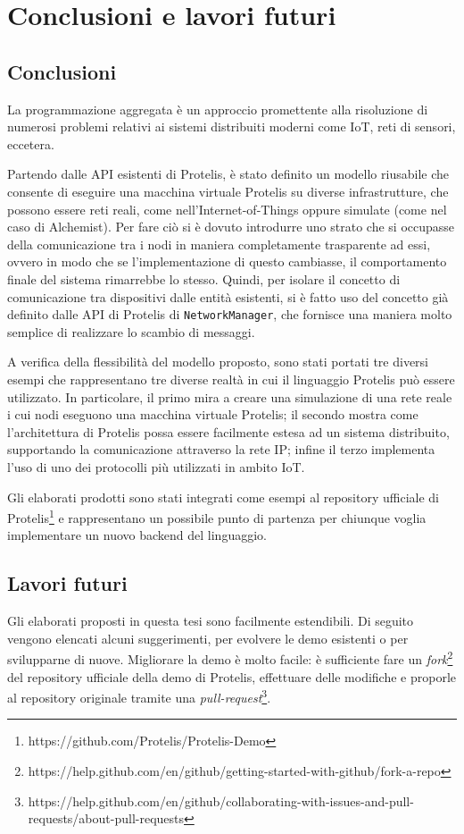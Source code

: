 \chapter{Conclusioni e lavori futuri}
\section{Conclusioni}
La programmazione aggregata è un approccio promettente alla risoluzione di
numerosi problemi relativi ai sistemi distribuiti moderni come IoT, reti di
sensori, eccetera.

Partendo dalle API esistenti di Protelis, è stato definito un modello riusabile
che consente di eseguire una macchina virtuale Protelis su diverse
infrastrutture, che possono essere reti reali, come nell'Internet-of-Things
oppure simulate (come nel caso di Alchemist). Per fare ciò si è dovuto
introdurre uno strato che si occupasse della comunicazione tra i nodi in maniera
completamente trasparente ad essi, ovvero in modo che se l'implementazione di
questo cambiasse, il comportamento finale del sistema rimarrebbe lo stesso. Quindi, per
isolare il concetto di comunicazione tra dispositivi dalle entità esistenti, si
è fatto uso del concetto già definito dalle API di Protelis di
\texttt{NetworkManager}, che fornisce una maniera molto semplice di realizzare
lo scambio di messaggi.

A verifica della flessibilità del modello proposto, sono stati portati tre
diversi esempi che rappresentano tre diverse realtà in cui il linguaggio
Protelis può essere utilizzato. In particolare, il primo mira a creare una
simulazione di una rete reale i cui nodi eseguono una macchina virtuale
Protelis; il secondo mostra come l'architettura di Protelis possa essere
facilmente estesa ad un sistema distribuito, supportando la comunicazione
attraverso la rete IP; infine il terzo implementa l'uso di uno dei protocolli
più utilizzati in ambito IoT.

Gli elaborati prodotti sono stati integrati come esempi al repository ufficiale
di Protelis\footnote{https://github.com/Protelis/Protelis-Demo} e rappresentano
un possibile punto di partenza per chiunque voglia implementare un nuovo backend
del linguaggio.

\section{Lavori futuri}
Gli elaborati proposti in questa tesi sono facilmente estendibili. Di seguito
vengono elencati alcuni suggerimenti, per evolvere le demo esistenti o per
svilupparne di nuove. Migliorare
la demo è molto facile: è sufficiente fare un
\textit{fork}\footnote{https://help.github.com/en/github/getting-started-with-github/fork-a-repo}
del repository ufficiale della demo di Protelis, effettuare delle modifiche e
proporle al repository originale tramite una
\textit{pull-request}\footnote{https://help.github.com/en/github/collaborating-with-issues-and-pull-requests/about-pull-requests}.


